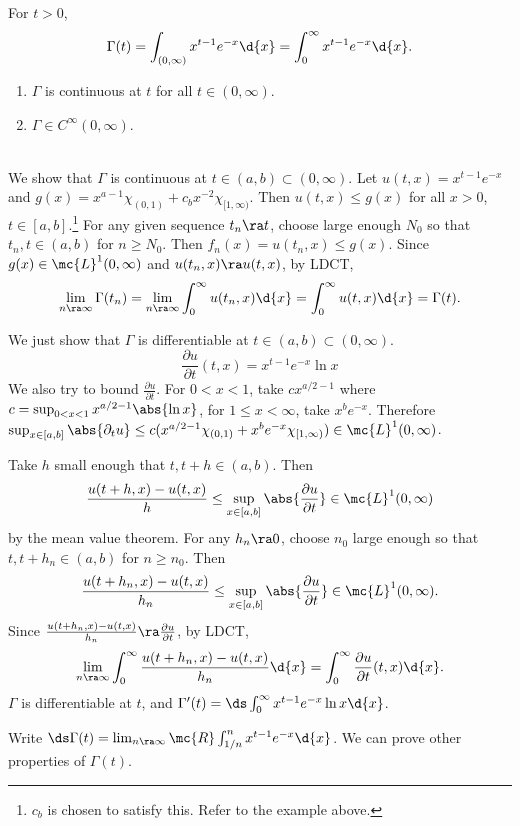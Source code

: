 \pagebreak

\recall {} For \(t > 0\),
\[
    \Gamma(t) = \int_{(0, \infty)} x^{t-1} e^{-x} \d{x} = \int_0^\infty x^{t-1} e^{-x} \d{x}.
\]
\begin{enumerate}
    \item \(\Gamma\) is continuous at \(t\) for all \(t \in (0, \infty)\).
    \item \(\Gamma \in C^\infty(0, \infty)\).
\end{enumerate}

\pf \\
 We show that \(\Gamma\) is continuous at \(t \in (a, b) \subset (0, \infty)\). Let \(u(t, x) = x^{t-1}e^{-x}\) and \(g(x) = x^{a - 1} \chi_{(0, 1)} + c_b x^{-2} \chi_{[1, \infty)}\). Then \(u(t, x) \leq g(x)\) for all \(x > 0\), \(t \in [a, b]\).\footnote{\(c_b\) is chosen to satisfy this. Refer to the example above.} For any given sequence \(t_n \ra t\), choose large enough \(N_0\) so that \(t_n, t \in (a, b)\) for \(n\geq N_0\). Then \(f_n(x) = u(t_n, x) \leq g(x)\). Since \(g(x) \in \mc{L}^{1}(0, \infty)\) and \(u(t_n, x) \ra u(t, x)\), by LDCT,
\[
    \lim_{n \ra \infty} \Gamma(t_n) = \lim_{n \ra \infty} \int_{0}^{\infty} u(t_n, x) \d{x} = \int_0^\infty u(t, x) \d{x} = \Gamma(t).
\]

 We just show that \(\Gamma\) is differentiable at \(t \in (a, b) \subset (0, \infty)\).
\[
    \frac{\partial u}{\partial t}(t, x) = x^{t-1} e^{-x} \ln x
\]
We also try to bound \(\frac{\partial u}{\partial t}\). For \(0 < x < 1\), take \(c x^{a/2-1}\) where \(c = \sup_{0<x<1} x^{a/2 - 1} \abs{\ln x}\), for \(1 \leq x < \infty\), take \(x^b e^{-x}\). Therefore \(\sup_{x \in [a, b]} \abs{\partial_t u} \leq c(x^{a/2 -1} \chi_{(0, 1)} + x^be^{-x} \chi_{[1, \infty)}) \in \mc{L}^{1}(0, \infty)\).

Take \(h\) small enough that \(t, t+h \in (a, b)\). Then
\[
    \frac{u(t+h, x) - u(t, x)}{h} \leq \sup_{x \in [a, b]} \abs{\frac{\partial u}{\partial t}} \in \mc{L}^{1}(0, \infty)
\]
by the mean value theorem. For any \(h_n \ra 0\), choose \(n_0\) large enough so that \(t, t + h_n \in (a, b)\) for \(n \geq n_0\). Then
\[
    \frac{u(t+h_n, x) - u(t, x)}{h_n} \leq \sup_{x \in [a, b]} \abs{\frac{\partial u}{\partial t}} \in \mc{L}^{1}(0, \infty).
\]
Since \(\frac{u(t+h_n, x) - u(t, x)}{h_n} \ra \frac{\partial u}{\partial t}\), by LDCT,
\[
    \lim_{n \ra \infty}\int_0^\infty \frac{u(t+h_n, x) - u(t, x)}{h_n} \d{x} = \int_0^\infty \frac{\partial u}{\partial t}(t, x) \d{x}.
\]
\(\Gamma\) is differentiable at \(t\), and \(\Gamma'(t) = \ds\int_0^\infty x^{t-1} e^{-x} \ln x \d{x}\).

\rmk Write \(\ds \Gamma(t) = \lim_{n \ra \infty} \mc{R} \int_{1/n}^{n} x^{t-1}e^{-x} \d{x}\). We can prove other properties of \(\Gamma(t)\).

\pagebreak
